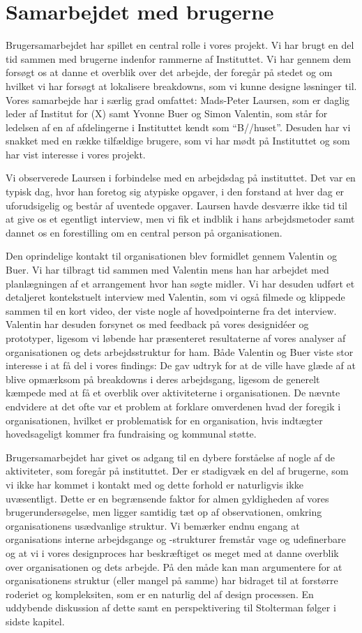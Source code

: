 \section{Samarbejdet med brugerne}
Brugersamarbejdet har spillet en central rolle i vores projekt. Vi har brugt en del tid sammen med brugerne indenfor rammerne af Instituttet. Vi har gennem dem forsøgt os at danne et overblik over det arbejde, der foregår på stedet og om hvilket vi har forsøgt at lokalisere breakdowns, som vi kunne designe løsninger til.
Vores samarbejde har i særlig grad omfattet: Mads-Peter Laursen, som er daglig leder af Institut for (X) samt Yvonne Buer og Simon Valentin, som står for ledelsen af en af afdelingerne i Instituttet kendt som “B//huset”. Desuden har vi snakket med en række tilfældige brugere, som vi har mødt på Instituttet og som har vist interesse i vores projekt.

Vi observerede Laursen i forbindelse med en arbejdsdag på instituttet. Det var en typisk dag, hvor han foretog sig atypiske opgaver, i den forstand at hver dag er uforudsigelig og består af uventede opgaver. Laursen havde desværre ikke tid til at give os et egentligt interview, men vi fik et indblik i hans arbejdsmetoder samt dannet os en forestilling om en central person på organisationen.

Den oprindelige kontakt til organisationen blev formidlet gennem Valentin og Buer. Vi har tilbragt tid sammen med Valentin mens han har arbejdet med planlægningen af et arrangement hvor han søgte midler. Vi har desuden udført et detaljeret kontekstuelt interview med Valentin, som vi også filmede og klippede sammen til en kort video, der viste nogle af hovedpointerne fra det interview. 
Valentin har desuden forsynet os med feedback på vores designidéer og prototyper, ligesom vi løbende har præsenteret resultaterne af vores analyser af organisationen og dets arbejdsstruktur for ham. Både Valentin og Buer viste stor interesse i at få del i vores findings: De gav udtryk for at de ville have glæde af at blive opmærksom på breakdowns i deres arbejdsgang, ligesom de generelt kæmpede med at få et overblik over aktiviteterne i organisationen. De nævnte endvidere at det ofte var et problem at forklare omverdenen hvad der foregik i organisationen, hvilket er problematisk for en organisation, hvis indtægter hovedsageligt kommer fra fundraising og kommunal støtte.

Brugersamarbejdet har givet os adgang til en dybere forståelse af nogle af de aktiviteter, som foregår på instituttet. Der er stadigvæk en del af brugerne, som vi ikke har kommet i kontakt med og dette forhold er naturligvis ikke uvæsentligt. Dette er en begrænsende faktor for almen gyldigheden af vores brugerundersøgelse, men ligger samtidig tæt op af observationen, omkring organisationens usædvanlige struktur. Vi bemærker endnu engang at organisations interne arbejdsgange og -strukturer fremstår vage og udefinerbare og at vi i vores designproces har beskræftiget os meget med at danne overblik over organisationen og dets arbejde. På den måde kan man argumentere for at organisationens struktur (eller mangel på samme) har bidraget til at forstørre roderiet og kompleksiten, som er en naturlig del af design processen. En uddybende diskussion af dette samt en perspektivering til Stolterman følger i sidste kapitel.
